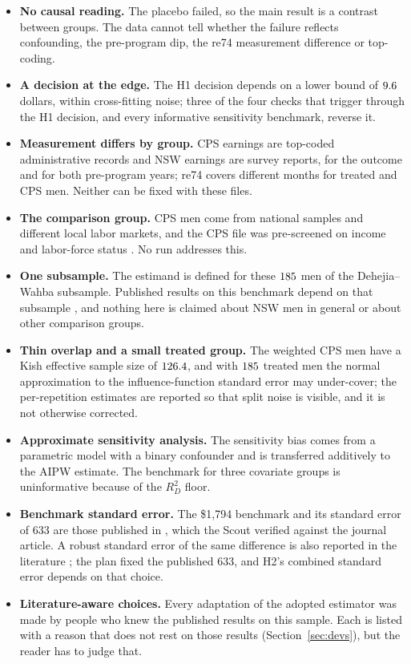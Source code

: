 \documentclass[11pt]{article}
\begin{document}
\begin{itemize}
  \setlength{\itemsep}{1pt}
  \item \textbf{No causal reading.} The placebo failed, so the main result is a contrast
        between groups. The data cannot tell whether the failure reflects confounding, the
        pre-program dip, the re74 measurement difference or top-coding.
  \item \textbf{A decision at the edge.} The H1 decision depends on a lower bound of
        $9.6$ dollars, within cross-fitting noise; three of the four checks that trigger through the H1
        decision, and every informative sensitivity benchmark, reverse it.
  \item \textbf{Measurement differs by group.} CPS earnings are top-coded administrative
        records and NSW earnings are survey reports, for the outcome and for both pre-program
        years; re74 covers different months for treated and CPS men. Neither can be fixed with
        these files.
  \item \textbf{The comparison group.} CPS men come from national samples and different
        local labor markets, and the CPS file was pre-screened on income and labor-force
        status \citep{lalonde1986,smith2005}. No run addresses this.
  \item \textbf{One subsample.} The estimand is defined for these $185$ men of
        the Dehejia--Wahba subsample. Published results on this benchmark depend on that
        subsample \citep{smith2005}, and nothing here is claimed about NSW men in general or
        about other comparison groups.
  \item \textbf{Thin overlap and a small treated group.} The weighted CPS men have a Kish
        effective sample size of $126.4$, and with $185$ treated men
        the normal approximation to the influence-function standard error may under-cover;
        the per-repetition estimates are reported so that split noise is visible, and it is
        not otherwise corrected.
  \item \textbf{Approximate sensitivity analysis.} The sensitivity bias comes from a
        parametric model with a binary confounder and is transferred additively to the AIPW
        estimate. The benchmark for three covariate groups is uninformative because of the
        $R^2_D$ floor.
  \item \textbf{Benchmark standard error.} The \$1,794 benchmark and its standard error
        of 633 are those published in \citet[Tables~2--3]{dehejia1999}, which the Scout
        verified against the journal article. A robust standard error of the same difference
        is also reported in the literature \citep{xu2024tutorial}; the plan fixed the published
        633, and H2's combined standard error depends on that choice.
  \item \textbf{Literature-aware choices.} Every adaptation of the adopted estimator was made
        by people who knew the published results on this sample. Each is listed with a reason
        that does not rest on those results (Section~\ref{sec:devs}), but the reader has to
        judge that.
\end{itemize}
\end{document}

